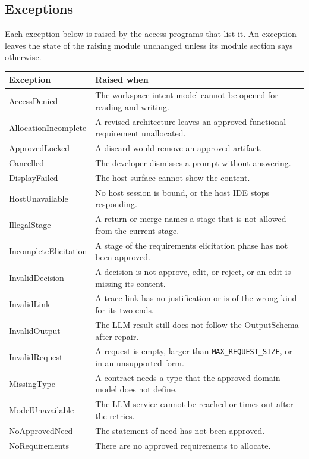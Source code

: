 \documentclass[12pt, titlepage]{article}
\begin{document}
\subsection{Exceptions}

Each exception below is raised by the access programs that list it. An
exception leaves the state of the raising module unchanged unless its module
section says otherwise.

{\renewcommand{\arraystretch}{1.2}
\begin{longtable}{l p{10.5cm}}
\toprule
\textbf{Exception} & \textbf{Raised when}\\
\midrule
\endhead
AccessDenied & The workspace intent model cannot be opened for reading and writing.\\
AllocationIncomplete & A revised architecture leaves an approved functional requirement unallocated.\\
ApprovedLocked & A discard would remove an approved artifact.\\
Cancelled & The developer dismisses a prompt without answering.\\
DisplayFailed & The host surface cannot show the content.\\
HostUnavailable & No host session is bound, or the host IDE stops responding.\\
IllegalStage & A return or merge names a stage that is not allowed from the current stage.\\
IncompleteElicitation & A stage of the requirements elicitation phase has not been approved.\\
InvalidDecision & A decision is not approve, edit, or reject, or an edit is missing its content.\\
InvalidLink & A trace link has no justification or is of the wrong kind for its two ends.\\
InvalidOutput & The LLM result still does not follow the OutputSchema after repair.\\
InvalidRequest & A request is empty, larger than \texttt{MAX\_REQUEST\_SIZE}, or in an unsupported form.\\
MissingType & A contract needs a type that the approved domain model does not define.\\
ModelUnavailable & The LLM service cannot be reached or times out after the retries.\\
NoApprovedNeed & The statement of need has not been approved.\\
NoRequirements & There are no approved requirements to allocate.\\

\end{longtable}}
\end{document}
